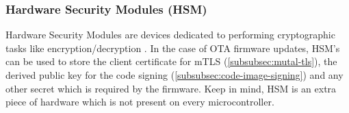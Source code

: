 \subsubsection{Hardware Security Modules (HSM)}\label{subsubsec:hsm}
Hardware Security Modules are devices dedicated to performing cryptographic tasks like encryption/decryption \cite{Mavrovouniotis2014}. In the case of OTA firmware updates, HSM's can be used to store the client certificate for mTLS (\ref{subsubsec:mutal-tls}), the derived public key for the code signing (\ref{subsubsec:code-image-signing}) and any other secret which is required by the firmware. Keep in mind, HSM is an extra piece of hardware which is not present on every microcontroller.
